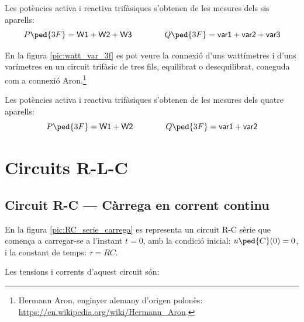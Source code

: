 Les potències activa i reactiva trifàsiques s'obtenen de les mesures
dels sis aparells:
\begin{equation}
    P\ped{3F} = \textsf{W1} +  \textsf{W2} + \textsf{W3}
    \qquad\qquad Q\ped{3F} = \textsf{var1} +  \textsf{var2} + \textsf{var3}
\end{equation}

En la figura \vref{pic:watt_var_3f} es pot veure la connexió d'uns
wattímetres i d'uns varímetres en un circuit trifàsic de tres fils,
equilibrat o desequilibrat, coneguda com a connexió Aron.\footnote{Hermann Aron, enginyer alemany d'origen polonès: \href{https://en.wikipedia.org/wiki/Hermann_Aron}{https:/\!\!/en.wikipedia.org/wiki/Hermann\_Aron}.}

\begin{center}
\centering
    
    \label{pic:watt_var_3f}
\end{center}

Les potències activa i reactiva trifàsiques s'obtenen de les mesures
dels quatre aparells:
\begin{equation}
    P\ped{3F} = \textsf{W1} +  \textsf{W2}
    \qquad\qquad Q\ped{3F} = \textsf{var1} +  \textsf{var2}
\end{equation}



\section{Circuits R-L-C}


\subsection{Circuit R-C --- Càrrega en corrent continu}\label{sec:RC-carrega}

En la figura \vref{pic:RC_serie_carrega} es representa un circuit R-C sèrie que comença a carregar-se a l'instant $t=0$, amb la condició inicial: $u\ped{C}(0) = 0$, i la constant de temps: $\tau = R C$.
\begin{center}
    
    \label{pic:RC_serie_carrega}
\end{center}

Les tensions i corrents d'aquest circuit són:

